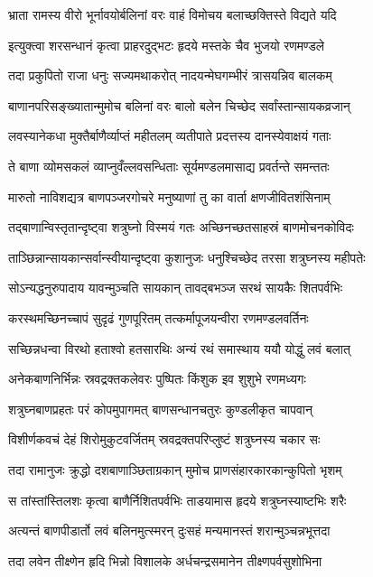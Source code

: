 \twolineshloka
{भ्राता रामस्य वीरो भूर्नावयोर्बलिनां वरः}
{वाहं विमोचय बलाच्छक्तिस्ते विद्यते यदि}%

\twolineshloka
{इत्युक्त्वा शरसन्धानं कृत्वा प्राहरदुद्भटः}
{हृदये मस्तके चैव भुजयो रणमण्डले}%

\twolineshloka
{तदा प्रकुपितो राजा धनुः सज्यमथाकरोत्}
{नादयन्मेघगम्भीरं त्रासयन्निव बालकम्}%

\twolineshloka
{बाणानपरिसङ्ख्यातान्मुमोच बलिनां वरः}
{बालो बलेन चिच्छेद सर्वांस्तान्सायकव्रजान्}%

\twolineshloka
{लवस्यानेकधा मुक्तैर्बाणैर्व्याप्तं महीतलम्}
{व्यतीपाते प्रदत्तस्य दानस्येवाक्षयं गताः}%

\twolineshloka
{ते बाणा व्योमसकलं व्याप्नुवँल्लवसन्धिताः}
{सूर्यमण्डलमासाद्य प्रवर्तन्ते समन्ततः}%

\twolineshloka
{मारुतो नाविशद्यत्र बाणपञ्जरगोचरे}
{मनुष्याणां तु का वार्ता क्षणजीवितशंसिनाम्}%

\twolineshloka
{तद्बाणान्विस्तृतान्दृष्ट्वा शत्रुघ्नो विस्मयं गतः}
{अच्छिनच्छतसाहस्रं बाणमोचनकोविदः}%

\twolineshloka
{ताञ्छिन्नान्सायकान्सर्वान्स्वीयान्दृष्ट्वा कुशानुजः}
{धनुश्चिच्छेद तरसा शत्रुघ्नस्य महीपतेः}%

\twolineshloka
{सोऽन्यद्धनुरुपादाय यावन्मुञ्चति सायकान्}
{तावद्बभञ्ज सरथं सायकैः शितपर्वभिः}%

\twolineshloka
{करस्थमच्छिनच्चापं सुदृढं गुणपूरितम्}
{तत्कर्मापूजयन्वीरा रणमण्डलवर्तिनः}%

\twolineshloka
{सच्छिन्नधन्वा विरथो हताश्वो हतसारथिः}
{अन्यं रथं समास्थाय ययौ योद्धुं लवं बलात्}%

\twolineshloka
{अनेकबाणनिर्भिन्नः स्रवद्रक्तकलेवरः}
{पुष्पितः किंशुक इव शुशुभे रणमध्यगः}%

\twolineshloka
{शत्रुघ्नबाणप्रहतः परं कोपमुपागमत्}
{बाणसन्धानचतुरः कुण्डलीकृत चापवान्}%

\twolineshloka
{विशीर्णकवचं देहं शिरोमुकुटवर्जितम्}
{स्रवद्रक्तपरिप्लुष्टं शत्रुघ्नस्य चकार सः}%

\twolineshloka
{तदा रामानुजः क्रुद्धो दशबाणाञ्छिताग्रकान्}
{मुमोच प्राणसंहारकारकान्कुपितो भृशम्}%

\twolineshloka
{स तांस्तांस्तिलशः कृत्वा बाणैर्निशितपर्वभिः}
{ताडयामास हृदये शत्रुघ्नस्याष्टभिः शरैः}%

\twolineshloka
{अत्यन्तं बाणपीडार्तो लवं बलिनमुत्स्मरन्}
{दुःसहं मन्यमानस्तं शरान्मुञ्चन्नभूत्तदा}%

\twolineshloka
{तदा लवेन तीक्ष्णेन हृदि भिन्नो विशालके}
{अर्धचन्द्रसमानेन तीक्ष्णपर्वसुशोभिना}%

